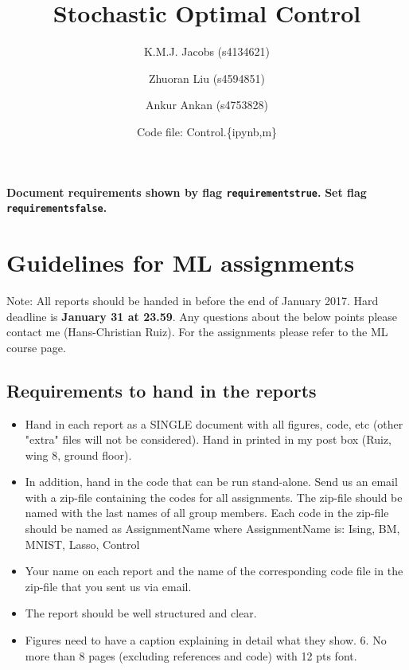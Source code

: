 \documentclass[10pt,a4paper]{article}
\author{K.M.J. Jacobs (s4134621) \and Zhuoran Liu (s4594851) \and Ankur Ankan (s4753828) \and Code file: Control.\{ipynb,m\}}
\title{Stochastic Optimal Control}
\newif\ifrequirements
\begin{document}
\maketitle

\newpage
\tableofcontents
\newpage

\ifrequirements
\color{red}
\textbf{Document requirements shown by flag \texttt{requirementstrue}.}
\textbf{Set flag \texttt{requirementsfalse}.}

\color{blue}
\section{Guidelines for ML assignments}
Note: All reports should be handed in before the end of January 2017. Hard deadline is \textbf{January 31 at 23.59}. Any questions about the below points please contact me (Hans-Christian Ruiz). For the assignments please refer to the ML course page.

\subsection{Requirements to hand in the reports}
\begin{itemize}
\item Hand in each report as a SINGLE document with all figures, code, etc (other "extra" files will not be considered). Hand in printed in my post box (Ruiz, wing 8, ground floor).
\item In addition, hand in the code that can be run stand-alone. Send us an email with a zip-file containing the codes for all assignments. The zip-file should be named with the last names of all group members. Each code in the zip-file should be named as AssignmentName where AssignmentName is: Ising, BM, MNIST, Lasso, Control
\item Your name on each report and the name of the corresponding code file in the zip-file that you sent us via email.
\item The report should be well structured and clear.
\item Figures need to have a caption explaining in detail what they show. 6. No more than 8 pages (excluding references and code) with 12 pts font.
\end{itemize}
\end{document}

